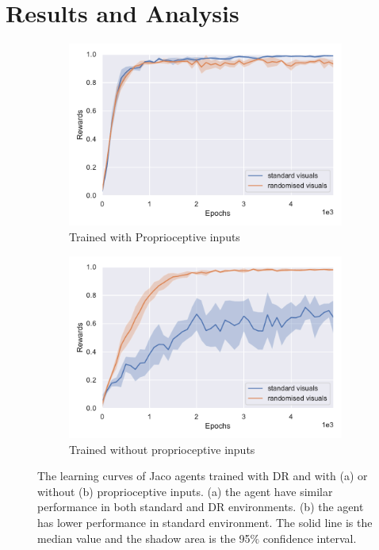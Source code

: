\section{Results and Analysis}
\label{ch6:results}
\begin{figure}[h!]
  \centering
  \begin{subfigure}{0.49\textwidth}
    \includegraphics[width=\textwidth]{figures/chapter6/training_curves/jaco_prop.pdf}
    \caption{Trained with Proprioceptive inputs}
  \end{subfigure}\hfill
  \begin{subfigure}{0.49\textwidth}
    \includegraphics[width=\textwidth]{figures/chapter6/training_curves/jaco_noprop.pdf}
    \caption{Trained without proprioceptive inputs}
  \end{subfigure}
  \caption[The learning curves of Jaco agents trained with DR and with or without proprioceptive inputs.]{The learning curves of Jaco agents trained with DR and with (a) or without (b) proprioceptive inputs. (a) the agent have similar performance in both standard and DR environments. (b) the agent has lower performance in standard environment. The solid line is the median value and the shadow area is the 95$\%$ confidence interval.}
  \label{fig:domain_shift}
\end{figure}

